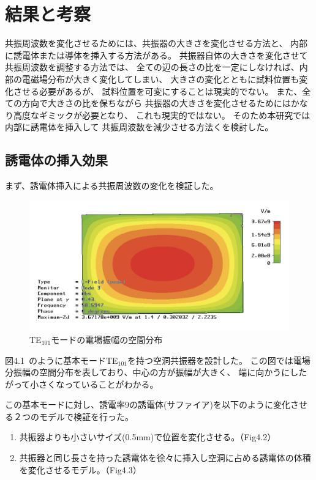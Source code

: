 \chapter{結果と考察}
共振周波数を変化させるためには、共振器の大きさを変化させる方法と、
内部に誘電体または導体を挿入する方法がある。
共振器自体の大きさを変化させて共振周波数を調整する方法では、
全ての辺の長さの比を一定にしなければ、内部の電磁場分布が大きく変化してしまい、
大きさの変化とともに試料位置も変化させる必要があるが、
試料位置を可変にすることは現実的でない。
また、全ての方向で大きさの比を保ちながら
共振器の大きさを変化させるためにはかなり高度なギミックが必要となり、
これも現実的ではない。
そのため本研究では内部に誘電体を挿入して
共振周波数を減少させる方法くを検討した。


\section{誘電体の挿入効果}
まず、誘電体挿入による共振周波数の変化を検証した。

\vspace{10 mm}

\begin{figure}[h]
  \begin{center}
    \includegraphics[width=12cm]{./image/te101.png}
    \caption{TE$_{101}$モードの電場振幅の空間分布}
    \label{fig:E-TE101}
  \end{center}
\end{figure}

図4.1 のように基本モードTE$_{101}$を持つ空洞共振器を設計した。
この図では電場分振幅の空間分布を表しており、中心の方が振幅が大きく、
端に向かうにしたがって小さくなっていることがわかる。

この基本モードに対し、誘電率9の誘電体(サファイア)を以下のように変化させる２つのモデルで検証を行った。

\begin{enumerate}
  \item 共振器よりも小さいサイズ(0.5mm)で位置を変化させる。（Fig4.2）
  \item 共振器と同じ長さを持った誘電体を徐々に挿入し空洞に占める誘電体の体積を変化させるモデル。（Fig4.3）
\end{enumerate}

